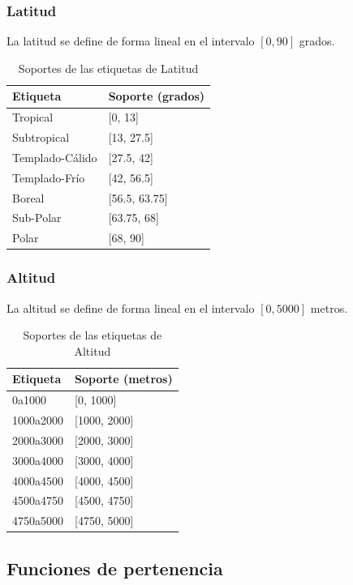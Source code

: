 \documentclass[11pt,a4paper]{article}
\begin{document}
\subsubsection{Latitud}

La latitud se define de forma lineal en el intervalo \([0, 90]\) grados.

\begin{table}[H]
\centering
\caption{Soportes de las etiquetas de Latitud}
\label{tab:latitud-soportes}
\begin{tabular}{@{}ll@{}}
\toprule
Etiqueta & Soporte (grados) \\
\midrule
Tropical & [0, 13] \\
Subtropical & [13, 27.5] \\
Templado-Cálido & [27.5, 42] \\
Templado-Frío & [42, 56.5] \\
Boreal & [56.5, 63.75] \\
Sub-Polar & [63.75, 68] \\
Polar & [68, 90] \\
\bottomrule
\end{tabular}
\end{table}

\clearpage

\subsubsection{Altitud}
La altitud se define de forma lineal en el intervalo \([0, 5000]\) metros.
\begin{table}[H]
\centering
\caption{Soportes de las etiquetas de Altitud}
\label{tab:altitud-soportes}
\begin{tabular}{@{}ll@{}}
\toprule
Etiqueta & Soporte (metros) \\
\midrule
0a1000 & [0, 1000] \\
1000a2000 & [1000, 2000] \\
2000a3000 & [2000, 3000] \\
3000a4000 & [3000, 4000] \\
4000a4500 & [4000, 4500] \\
4500a4750 & [4500, 4750] \\
4750a5000 & [4750, 5000] \\
\bottomrule
\end{tabular}
\end{table}

\subsection{Funciones de pertenencia}
\end{document}
